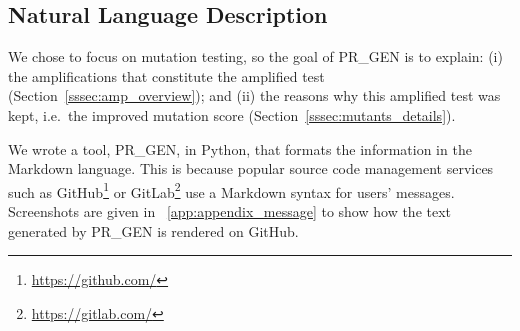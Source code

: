 \documentclass[a4paper,11pt]{sdm_internship}
\newcommand{\todo}[1]{\colorbox{Red!75}{\textcolor{white}{\textbf{TODO\ifx&#1&\else: #1\fi}}}}
\newcommand{\prgen}{PR\_GEN\xspace}
\theoremstyle{definition}
\begin{document}





\subsection{Natural Language Description}%
\label{ssec:nl_description}

We chose to focus on mutation testing, so the goal of \prgen{} is to explain: (i) the amplifications that constitute the amplified test (Section~\ref{sssec:amp_overview}); and (ii) the reasons why this amplified test was kept, i.e.\ the improved mutation score (Section~\ref{sssec:mutants_details}).

We wrote a tool, \prgen{}, in Python, that formats the information in the Markdown language.
This is because popular source code management services such as GitHub\footnote{\url{https://github.com/}} or GitLab\footnote{\url{https://gitlab.com/}} use a Markdown syntax for users' messages.
Screenshots are given in \appendixname~\ref{app:appendix_message} to show how the text generated by \prgen{} is rendered on GitHub.
\end{document}
